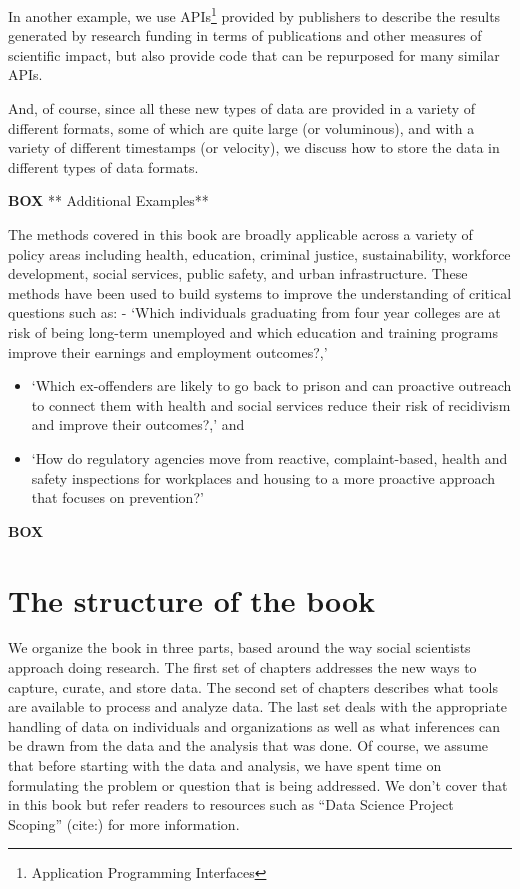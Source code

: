 \documentclass[]{krantz}
\begin{document}
In another example, we use APIs\footnote{Application Programming
  Interfaces} provided by publishers to describe the results generated
by research funding in terms of publications and other measures of
scientific impact, but also provide code that can be repurposed for many
similar APIs.

And, of course, since all these new types of data are provided in a
variety of different formats, some of which are quite large (or
voluminous), and with a variety of different timestamps (or velocity),
we discuss how to store the data in different types of data formats.

\textbf{BOX} ** Additional Examples**

The methods covered in this book are broadly applicable across a variety
of policy areas including health, education, criminal justice,
sustainability, workforce development, social services, public safety,
and urban infrastructure. These methods have been used to build systems
to improve the understanding of critical questions such as: - `Which
individuals graduating from four year colleges are at risk of being
long-term unemployed and which education and training programs improve
their earnings and employment outcomes?,'

\begin{itemize}
\item
  `Which ex-offenders are likely to go back to prison and can proactive
  outreach to connect them with health and social services reduce their
  risk of recidivism and improve their outcomes?,' and
\item
  `How do regulatory agencies move from reactive, complaint-based,
  health and safety inspections for workplaces and housing to a more
  proactive approach that focuses on prevention?'
\end{itemize}

\textbf{BOX}

\section{The structure of the book}\label{the-structure-of-the-book}

We organize the book in three parts, based around the way social
scientists approach doing research. The first set of chapters addresses
the new ways to capture, curate, and store data. The second set of
chapters describes what tools are available to process and analyze data.
The last set deals with the appropriate handling of data on individuals
and organizations as well as what inferences can be drawn from the data
and the analysis that was done. Of course, we assume that before
starting with the data and analysis, we have spent time on formulating
the problem or question that is being addressed. We don't cover that in
this book but refer readers to resources such as ``Data Science Project
Scoping'' (cite:) for more information.
\end{document}
